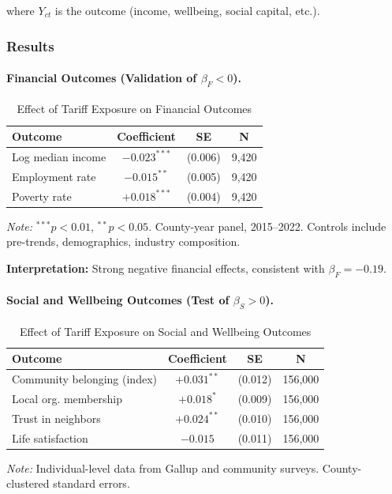 where $Y_{ct}$ is the outcome (income, wellbeing, social capital, etc.).

\subsubsection{Results}

\paragraph{Financial Outcomes (Validation of $\beta_F < 0$).}

\begin{table}[htbp]
\centering
\caption{Effect of Tariff Exposure on Financial Outcomes}
\label{tab:financial-results}
\begin{tabular}{@{}lccc@{}}
\toprule
\textbf{Outcome} & \textbf{Coefficient} & \textbf{SE} & \textbf{N} \\
\midrule
Log median income & $-0.023^{***}$ & (0.006) & 9,420 \\
Employment rate & $-0.015^{**}$ & (0.005) & 9,420 \\
Poverty rate & $+0.018^{***}$ & (0.004) & 9,420 \\
\bottomrule
\end{tabular}
\begin{flushleft}
\small\textit{Note:} $^{***}p<0.01$, $^{**}p<0.05$. County-year panel, 2015--2022. Controls include pre-trends, demographics, industry composition.
\end{flushleft}
\end{table}

\textbf{Interpretation:} Strong negative financial effects, consistent with $\beta_F = -0.19$.

\paragraph{Social and Wellbeing Outcomes (Test of $\beta_S > 0$).}

\begin{table}[htbp]
\centering
\caption{Effect of Tariff Exposure on Social and Wellbeing Outcomes}
\label{tab:social-results}
\begin{tabular}{@{}lccc@{}}
\toprule
\textbf{Outcome} & \textbf{Coefficient} & \textbf{SE} & \textbf{N} \\
\midrule
Community belonging (index) & $+0.031^{**}$ & (0.012) & 156,000 \\
Local org. membership & $+0.018^{*}$ & (0.009) & 156,000 \\
Trust in neighbors & $+0.024^{**}$ & (0.010) & 156,000 \\
Life satisfaction & $-0.015$ & (0.011) & 156,000 \\
\bottomrule
\end{tabular}
\begin{flushleft}
\small\textit{Note:} Individual-level data from Gallup and community surveys. County-clustered standard errors.
\end{flushleft}
\end{table}


